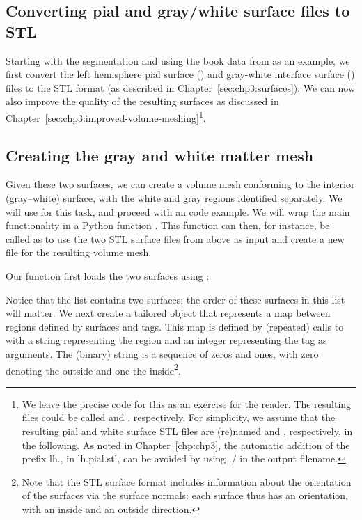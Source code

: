 \subsection{Converting pial and gray/white surface files to STL}
Starting with the \freesurfer{} segmentation and using the book data
from  as an example, we first convert the
left hemisphere pial surface () and gray-white interface
surface () files to the STL format (as described in
Chapter~\ref{sec:chp3:surfaces}):
\noindent We can now also improve the quality of the resulting
surfaces as discussed in
Chapter~\ref{sec:chp3:improved-volume-meshing}\footnote{We leave the
  precise code for this as an exercise for the reader. The resulting
  files could be called  and
  , respectively. For simplicity, we assume that the
  resulting pial and white surface STL files are (re)named
   and , respectively, in the following. As 
  noted in Chapter~\ref{chp:chp3}, the automatic addition of the prefix lh., in
  lh.pial.stl, can be avoided by using ./ in the output filename.}.

\subsection{Creating the gray and white matter mesh}%
\label{sec:chp4:tools:gray-white:mesh-creation}
Given these two surfaces, we can create a volume mesh conforming to
the interior (gray--white) surface, with the white and gray regions
identified separately. We will use \svmtk{} for this task, and
proceed with an \svmtk{} code example. We will wrap the main
functionality in a Python function
. This function can then, for instance,
be called as
to use the two STL surface files from above as input and create a new
file  for the resulting volume mesh.

Our function first loads the two surfaces using \svmtk{}:

\noindent Notice that the list  contains 
two surfaces; the order of these surfaces in this list will matter.  We next 
create a tailored \svmtk{}  object that represents 
a map between regions defined by surfaces and tags. This map is defined by
(repeated) calls to  with a string representing the
region and an integer representing the tag as arguments. The (binary)
string is a sequence of zeros and ones, with zero denoting the outside
and one the inside\footnote{Note that the STL surface 
format includes information about the orientation of the surfaces via the 
surface normals: each surface thus has an orientation, with an inside and an 
outside direction.}.

